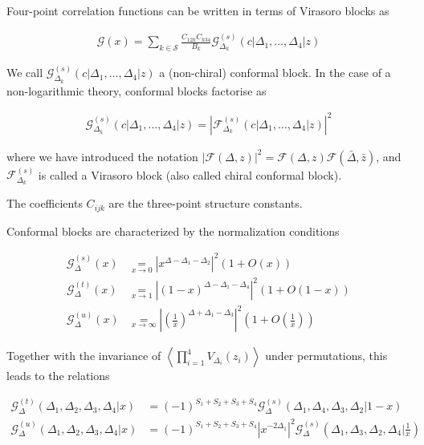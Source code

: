 \documentclass[a4paper]{article}
\numberwithin{equation}{section}
\begin{document}
Four-point correlation functions can be written in terms of Virasoro blocks as

\begin{align}
  \mathcal G(x) = \sum_{k \in \mathcal S} \frac{C_{12k} C_{k34}}{B_{k}} \mathcal G_{\Delta_k}^{(s)}(c |\Delta_{1}, \dots, \Delta_{4}|z)\end{align}

We call \(\mathcal G_{\Delta_k}^{(s)}(c |\Delta_{1}, \dots, \Delta_{4}|z)\) a (non-chiral) conformal block.
In the case of a non-logarithmic theory, conformal blocks factorise as

\begin{align}
  \mathcal G_{\Delta_k}^{(s)}(c |\Delta_{1}, \dots, \Delta_{4}|z) = \left| \mathcal F^{(s)}_{\Delta_{k}}(c | \Delta_{1}, \dots, \Delta_{4} | z) \right|^{2}
\end{align}

where we have introduced the notation \(\left|\mathcal F(\Delta, z)\right|^2 = \mathcal{F}(\Delta, z) \mathcal{F}(\bar\Delta, \bar z)\), and \(\mathcal F^{(s)}_{\Delta_k}\) is called a Virasoro block (also called chiral conformal block).

The coefficients \(C_{ijk}\) are the three-point structure constants.

Conformal blocks are characterized by the normalization conditions

\begin{align}
 \mathcal{G}^{(s)}_\Delta(x) & \underset{x\to 0}{=} \left| x^{\Delta-\Delta_1-\Delta_2}\right|^2 \left(1+O(x)\right)
 \\
 \mathcal{G}^{(t)}_\Delta(x) & \underset{x\to 1}{=} \left|(1-x)^{\Delta-\Delta_1-\Delta_4}\right|^2 \left(1+O(1-x)\right)
 \\
 \mathcal{G}^{(u)}_\Delta(x) & \underset{x\to \infty}{=} \left|\left(\frac{1}{x}\right)^{\Delta+\Delta_1-\Delta_3} \right|^2\left(1+O\left(\frac{1}{x}\right)\right)
\end{align}

Together with the invariance of \(\left\langle \prod_{i=1}^4 V_{\Delta_i}(z_i) \right\rangle\) under permutations, this leads to the relations

\begin{align}
\mathcal{G}^{(t)}_{\Delta}(\Delta_1,\Delta_2,\Delta_3,\Delta_4|x)
&= (-1)^{S_1+S_2+S_3+S_4}
\mathcal{G}^{(s)}_{\Delta}(\Delta_1,\Delta_4,\Delta_3,\Delta_2|1-x)
\\
\mathcal{G}^{(u)}_\Delta(\Delta_1,\Delta_2,\Delta_3,\Delta_4|x)
&= (-1)^{S_1+S_2+S_3+S_4}
\left|x^{-2\Delta_1}\right|^2 \mathcal{G}^{(s)}_\Delta(\Delta_1,\Delta_3,\Delta_2,\Delta_4|\tfrac{1}{x})
\end{align}
\end{document}
